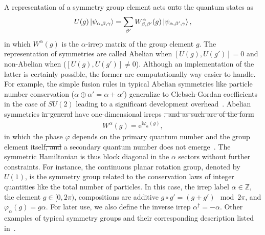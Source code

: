 \documentclass{svmono}
\def\ri{\mathrm i}
\def\re{\mathrm e}
\newcommand{\commutator}[1]{\left[ #1 \right]}
\providecommand{\DIFaddtex}[1]{{\protect\color{blue}\uwave{#1}}} %
\providecommand{\DIFdeltex}[1]{{\protect\color{red}\sout{#1}}}                      %
\providecommand{\DIFaddbegin}{} %
\providecommand{\DIFaddend}{} %
\providecommand{\DIFdelbegin}{} %
\providecommand{\DIFdelend}{} %
\providecommand{\DIFadd}[1]{\texorpdfstring{\DIFaddtex{#1}}{#1}} %
\providecommand{\DIFdel}[1]{\texorpdfstring{\DIFdeltex{#1}}{}} %
\newcommand{\DIFscaledelfig}{0.5}
\newlength{\DIFdelgraphicswidth} %
\newlength{\DIFdelgraphicsheight} %
\newcommand{\DIFaddincludegraphics}[2][]{{\color{blue}\fbox{\DIFOincludegraphics[#1]{#2}}}} %
\newcommand{\DIFdelincludegraphics}[2][]{%
\sbox{\DIFdelgraphicsbox}{\DIFOincludegraphics[#1]{#2}}%
\settoboxwidth{\DIFdelgraphicswidth}{\DIFdelgraphicsbox} %
\settoboxtotalheight{\DIFdelgraphicsheight}{\DIFdelgraphicsbox} %
\scalebox{\DIFscaledelfig}{%
\parbox[b]{\DIFdelgraphicswidth}{\usebox{\DIFdelgraphicsbox}\\[-\baselineskip] \rule{\DIFdelgraphicswidth}{0em}}\llap{\resizebox{\DIFdelgraphicswidth}{\DIFdelgraphicsheight}{%
\setlength{\unitlength}{\DIFdelgraphicswidth}%
\begin{picture}(1,1)%
\thicklines\linethickness{2pt} %
{\color[rgb]{1,0,0}\put(0,0){\framebox(1,1){}}}%
{\color[rgb]{1,0,0}\put(0,0){\line( 1,1){1}}}%
{\color[rgb]{1,0,0}\put(0,1){\line(1,-1){1}}}%
\end{picture}%
}\hspace*{3pt}}} %
} %
\DeclareRobustCommand{\DIFaddbegin}{\DIFOaddbegin \let\includegraphics\DIFaddincludegraphics} %
\DeclareRobustCommand{\DIFaddend}{\DIFOaddend \let\includegraphics\DIFOincludegraphics} %
\DeclareRobustCommand{\DIFdelbegin}{\DIFOdelbegin \let\includegraphics\DIFdelincludegraphics} %
\DeclareRobustCommand{\DIFdelend}{\DIFOaddend \let\includegraphics\DIFOincludegraphics} %
\begin{document}
A representation of a symmetry group element acts \DIFdelbegin \DIFdel{onto }\DIFdelend \DIFaddbegin \DIFadd{on }\DIFaddend the quantum states as
\DIFdelbegin %
\DIFdelend \DIFaddbegin \begin{align}
    U(g)\ket{\psi_{\alpha,\beta,\gamma}} = \sum_{\beta'}W^{\alpha}_{\beta,\beta'}(g)\ket{\psi_{\alpha,\beta',\gamma}},
\end{align}\DIFaddend 
in which $W^\alpha(g)$ is the $\alpha$-irrep matrix of the group element $g$.
The representation of symmetries are called Abelian when $\commutator{U(g),U(g')}=0$ and non-Abelian when ($\commutator{U(g),U(g')}\neq0$).
Although an implementation of the latter is certainly possible, the former are computationally way easier to handle.
For example, the simple fusion rules in typical Abelian symmetries like particle number conservation ($\alpha\oplus\alpha'=\alpha+\alpha'$) generalize to Clebsch-Gordan coefficients in the case of $SU(2)$ leading to a significant development overhead~\cite{Schmoll2020}.
Abelian symmetries \DIFdelbegin \DIFdel{in general }\DIFdelend have one-dimensional irreps \DIFdelbegin \DIFdel{, and as such are of the form
}%
\DIFdelend \DIFaddbegin \DIFadd{in general, i.e.
}\begin{align}
    W^\alpha(g) = \re^{\ri\varphi_\alpha(g)},
\end{align}\DIFaddend 
in which the phase $\varphi$ depends on the primary quantum number and the group element itself\DIFdelbegin \DIFdel{, and }\DIFdelend \DIFaddbegin \DIFadd{.
In this case, }\DIFaddend a secondary quantum number does not emerge~\cite{Silvi2019}.
The symmetric Hamiltonian is thus block diagonal in the $\alpha$ sectors without further constraints.
For instance, the continuous planar rotation group, denoted by $U(1)$, is the symmetry group related to the conservation laws of integer quantities like the total number of particles.
In this case, the irrep label $\alpha\in\mathds Z$, the element $g\in[0,2\pi)$, compositions are additive $g\circ g' = {(g+g')\mod 2\pi}$, and $\varphi_\alpha(g) = g\alpha$.
For later use, we also define the inverse irrep $\alpha^\dag=-\alpha$.
Other examples of typical symmetry groups and their corresponding description listed in~\cite{Silvi2019}.
\end{document}
